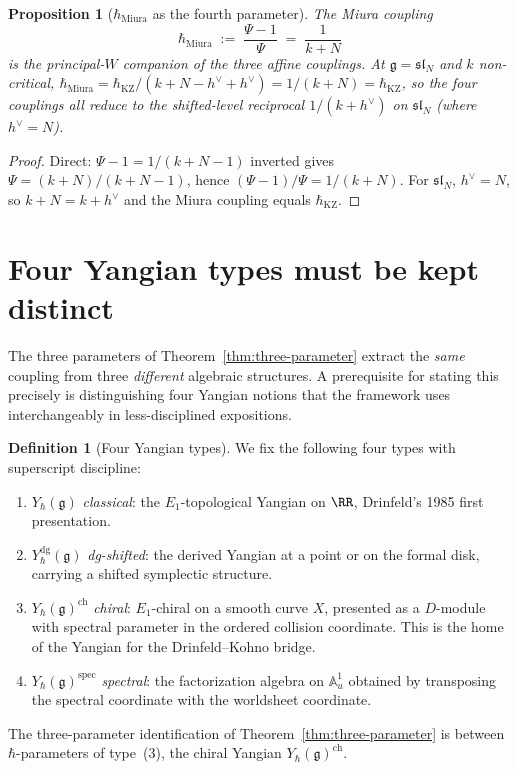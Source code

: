 \documentclass[11pt]{article}
\theoremstyle{plain}
\newtheorem{proposition}[theorem]{Proposition}
\theoremstyle{definition}
\newtheorem{definition}[theorem]{Definition}
\theoremstyle{remark}
\newcommand{\fg}{\mathfrak{g}}
\newcommand{\fsl}{\mathfrak{sl}}
\numberwithin{equation}{section}
\begin{document}
\begin{proposition}[$\hbar_{\mathrm{Miura}}$ as the fourth
parameter]\label{prop:hbar-miura-3hbar}
The \emph{Miura coupling}
\[
 \hbar_{\mathrm{Miura}} \;:=\; \frac{\Psi - 1}{\Psi}
 \;=\; \frac{1}{k + N}
\]
is the principal-$W$ companion of the three affine couplings.
At $\fg = \fsl_N$ and $k$ non-critical, $\hbar_{\mathrm{Miura}} =
\hbar_{\mathrm{KZ}}/(k + N - h^\vee + h^\vee) = 1/(k+N) =
\hbar_{\mathrm{KZ}}$, so the four couplings all reduce to the
shifted-level reciprocal $1/(k+h^\vee)$ on $\fsl_N$ (where $h^\vee =
N$).
\end{proposition}

\begin{proof}
Direct: $\Psi - 1 = 1/(k+N-1)$ inverted gives $\Psi = (k+N)/(k+N-1)$,
hence $(\Psi-1)/\Psi = 1/(k+N)$. For $\fsl_N$, $h^\vee = N$, so
$k+N = k+h^\vee$ and the Miura coupling equals $\hbar_{\mathrm{KZ}}$.
\end{proof}

\section{Four Yangian types must be kept distinct}
\label{sec:four-yangian-types-3hbar}

The three parameters of Theorem~\ref{thm:three-parameter} extract
the \emph{same} coupling from three \emph{different} algebraic
structures. A prerequisite for stating this precisely is
distinguishing four Yangian notions that the framework uses
interchangeably in less-disciplined expositions.

\begin{definition}[Four Yangian types]
\label{def:four-yangian-types-3hbar}
We fix the following four types with superscript discipline:
\begin{enumerate}[label=\textup{(\arabic*)}]
 \item $Y_\hbar(\fg)$ \emph{classical}: the $E_1$-topological
 Yangian on $\RR$, Drinfeld's 1985 first presentation.
 \item $Y^{\mathrm{dg}}_\hbar(\fg)$ \emph{dg-shifted}: the derived
 Yangian at a point or on the formal disk, carrying a shifted
 symplectic structure.
 \item $Y_\hbar(\fg)^{\mathrm{ch}}$ \emph{chiral}: $E_1$-chiral on
 a smooth curve $X$, presented as a $D$-module with spectral
 parameter in the ordered collision coordinate. This is the home
 of the Yangian for the Drinfeld--Kohno bridge.
 \item $Y_\hbar(\fg)^{\mathrm{spec}}$ \emph{spectral}: the
 factorization algebra on $\mathbb{A}^1_u$ obtained by transposing
 the spectral coordinate with the worldsheet coordinate.
\end{enumerate}
The three-parameter identification of
Theorem~\ref{thm:three-parameter} is between $\hbar$-parameters of
type~(3), the chiral Yangian $Y_\hbar(\fg)^{\mathrm{ch}}$.
\end{definition}
\end{document}
